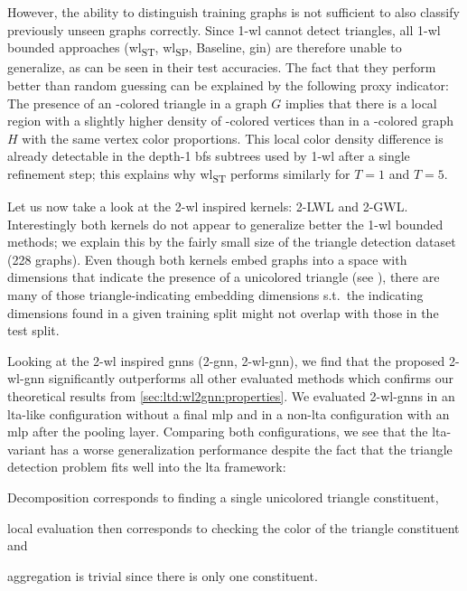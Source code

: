 However, the ability to distinguish training graphs is not sufficient to also classify previously unseen graphs correctly.
Since 1-\acs{wl} cannot detect triangles, all 1-\acs{wl} bounded approaches (\acs{wl}\textsubscript{ST}, \acs{wl}\textsubscript{SP}, Baseline, \acs{gin}) are therefore unable to generalize, as can be seen in their test accuracies.
The fact that they perform better than random guessing can be explained by the following proxy indicator:
The presence of an -colored triangle in a graph $G$ implies that there is a local region with a slightly higher density of -colored vertices than in a -colored graph $H$ with the same vertex color proportions.
This local color density difference is already detectable in the depth-1 \acs{bfs} subtrees used by 1-\acs{wl} after a single refinement step; this explains why \acs{wl}\textsubscript{ST} performs similarly for $T = 1$ and $T = 5$.

Let us now take a look at the 2-\acs{wl} inspired kernels: 2-LWL and 2-GWL.\@
Interestingly both kernels do not appear to generalize better the 1-\acs{wl} bounded methods;
we explain this by the fairly small size of the triangle detection dataset (228 graphs).
Even though both kernels embed graphs into a space with dimensions that indicate the presence of a unicolored triangle (see ), there are many of those triangle-indicating embedding dimensions s.t.\ the indicating dimensions found in a given training split might not overlap with those in the test split.

Looking at the 2-\acs{wl} inspired \acp{gnn} (2-\acs{gnn}, 2-\acs{wl}-\acs{gnn}), we find that the proposed 2-\acs{wl}-\acs{gnn} significantly outperforms all other evaluated methods which confirms our theoretical results from \cref{sec:ltd:wl2gnn:properties}.
We evaluated 2-\acs{wl}-\acsp{gnn} in an \acs{lta}-like configuration without a final \ac{mlp} and in a non-\acs{lta} configuration with an \ac{mlp} after the pooling layer.
Comparing both configurations, we see that the \acs{lta}-variant has a worse generalization performance despite the fact that the triangle detection problem fits well into the \ac{lta} framework:
\begin{enumerate*}[label={\circled{\small\arabic*}}]
	\item Decomposition corresponds to finding a single unicolored triangle constituent,
	\item local evaluation then corresponds to checking the color of the triangle constituent and
	\item aggregation is trivial since there is only one constituent.
\end{enumerate*}

